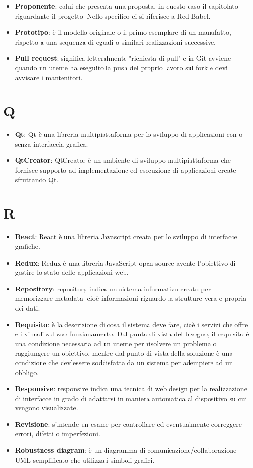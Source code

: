 \documentclass[a4paper, oneside, openany, dvipsnames, table]{article}
\begin{document}
\begin{itemize}
\item \textbf{Proponente}: colui che presenta una proposta, in questo caso il capitolato riguardante il progetto. Nello specifico ci si riferisce a Red Babel.
\item \textbf{Prototipo}: è il modello originale o il primo esemplare di un manufatto, rispetto a una sequenza di eguali o similari realizzazioni successive.
\item \textbf{Pull request}: significa letteralmente "richiesta di pull" e in Git avviene quando un utente ha eseguito la push del proprio lavoro sul fork e devi avvisare i mantenitori.
\end{itemize}

\section{Q}
\begin{itemize}
\item \textbf{Qt}: Qt è una libreria multipiattaforma per lo sviluppo di applicazioni con o senza interfaccia grafica.
\item \textbf{QtCreator}: QtCreator è un ambiente di sviluppo multipiattaforma che fornisce supporto ad implementazione ed esecuzione di applicazioni create sfruttando Qt.
\end{itemize}

\section{R}
\begin{itemize}
\item \textbf{React}: React è una libreria Javascript creata per lo sviluppo di interfacce grafiche.
\item \textbf{Redux}: Redux è una libreria JavaScript open-source avente l'obiettivo di gestire lo stato delle applicazioni web.
\item \textbf{Repository}: repository indica un sistema informativo creato per memorizzare metadata, cioè informazioni riguardo la strutture vera e propria dei dati.
\item \textbf{Requisito}: è la descrizione di cosa il sistema deve fare, cioè i servizi che offre e i vincoli sul suo funzionamento. Dal punto di vista del bisogno, il requisito è una condizione necessaria ad un utente per risolvere un problema o raggiungere un obiettivo, mentre dal punto di vista della soluzione è una condizione che dev'essere soddisfatta da un sistema per adempiere ad un obbligo.
\item \textbf{Responsive}: responsive indica una tecnica di web design per la realizzazione di interfacce in grado di adattarsi in maniera automatica al dispositivo su cui vengono visualizzate.
\item \textbf{Revisione}: s'intende un esame per controllare ed eventualmente correggere errori, difetti o imperfezioni.
\item \textbf{Robustness diagram}: è un diagramma di comunicazione/collaborazione UML semplificato che utilizza i simboli grafici.
\end{itemize}
\end{document}
